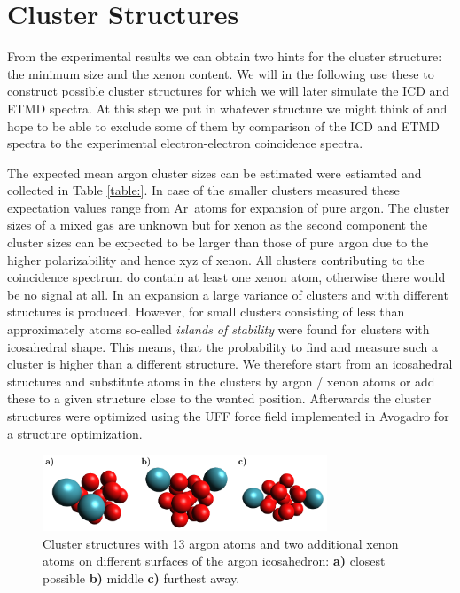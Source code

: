 \section{Cluster Structures}

From the experimental results we can obtain two hints for the cluster
structure: the minimum size and the xenon content. We will in the following
use these to construct possible cluster structures for which we will later
simulate the ICD and ETMD spectra. At this step we put in whatever structure
we might think of and hope to be able to exclude some of them by comparison of
the ICD and ETMD spectra to the experimental electron-electron coincidence
spectra.

The expected mean argon cluster sizes can be
estimated were estiamted and collected in Table \ref{table:}.
In case of the smaller clusters measured
these expectation values range from \unit[3 -- 21]{Ar atoms} for
expansion of pure argon. The cluster sizes of a mixed gas are unknown but
for xenon as the second component the cluster sizes can be expected to
be larger than those of pure argon due to the higher polarizability
and hence xyz of xenon. All clusters contributing to the coincidence spectrum
do contain at least one xenon atom, otherwise there would be no signal at all.
In an expansion a large variance of clusters and with different structures
is produced. However, for small clusters consisting of less than
approximately \unit[1000]{atoms} so-called \emph{islands of stability} were
found for clusters with icosahedral shape. This means, that the probability
to find and measure such a cluster is higher than a different structure.
We therefore start from an icosahedral structures and substitute atoms
in the clusters by
argon / xenon atoms or add these to a given structure close to the wanted
position. Afterwards the cluster structures were optimized using the
UFF force field \cite{} implemented in
Avogadro \cite{} for a structure optimization.

\begin{figure}[h]
 \centering
 \includegraphics[width=8.5cm]{pics/cluster_2_overview.pdf}
 \caption{Cluster structures with 13 argon atoms and two additional xenon
          atoms on different surfaces of the argon icosahedron:
          \textbf{a)} closest possible \textbf{b)} middle \textbf{c)}
          furthest away.}
 \label{figure:cluster_2_overview}
\end{figure}

